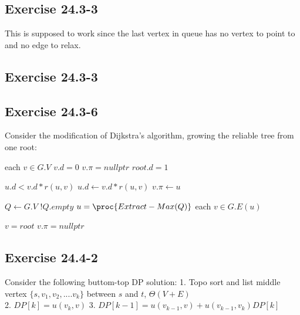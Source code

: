 \documentclass[]{article}
\begin{document}
\subsection{Exercise 24.3-3}
This is supposed to work since the last vertex in queue has no vertex to point to and no edge to relax.

\subsection{Exercise 24.3-3}

\subsection{Exercise 24.3-6}

Consider the modification of Dijkstra’s algorithm, growing the reliable tree from one root:

\begin{codebox}
	\li \For each $v \in G.V$
	\li \Do	$v.d = 0$
	\li 	$v.\pi = nullptr$ \End
	\li  $root.d = 1$
\end{codebox}

\begin{codebox}
	\li \If $u.d < v.d * r(u, v)$ 
	\li 	\Then $u.d \leftarrow v.d * r(u, v)$
	\li  		  $v.\pi \leftarrow u$ \End
\end{codebox}

\begin{codebox}
	\li {}
	\li $Q \leftarrow G.V$	
	\li \While $!Q.empty$
	\li \Do $u = \proc{Extract-Max(Q)}$
	\li \For each $v \in G.E(u)$
	\li \Do {}
\end{codebox}

\begin{codebox}
	\li \If $v = root$
	\li \Then \Return
	\li \Else
	\li \If $v.\pi = nullptr$
	\li \Then {} 
	\li \Else
	\li {}
	\li {}
\end{codebox}
\subsection{Exercise 24.4-2}
Consider the following buttom-top DP solution:
1. Topo sort and list middle vertex $\{s, v_1, v_2, .... v_k\}$ between $s$ and $t$, $\Theta(V+E)$\\
2. $DP[k] = u(v_k, v)$
3. $DP[k-1] = u(v_{k-1}, v) + u(v_{k-1}, v_{k})DP[k]$\\
\end{document}
